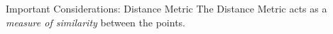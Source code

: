 \documentclass[usenames,dvipsnames]{beamer}
\begin{document}
\begin{frame}{Important Considerations: Distance Metric}
The Distance Metric acts as a \emph{measure of similarity} between the points.

{\centering
{}
}
\end{frame}
\end{document}
